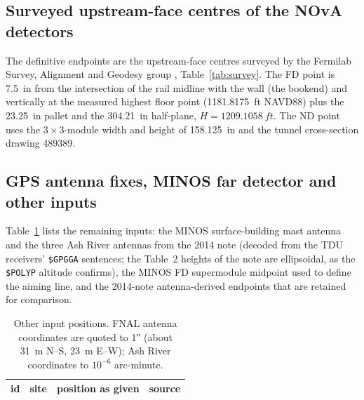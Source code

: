 \documentclass[11pt,letterpaper]{article}
\newcommand{\ND}{ND}
\newcommand{\FD}{FD}
\newcommand{\code}[1]{\texttt{#1}}
\begin{document}
\subsection{Surveyed upstream-face centres of the NOvA detectors}
The definitive endpoints are the upstream-face centres surveyed by the Fermilab Survey, Alignment and Geodesy group \cite{bocean2026nd,bocean2026fd}, Table~\ref{tab:survey}.  The \FD{} point is \SI{7.5}{in} from the intersection of the rail midline with the wall (the bookend) and vertically at the measured highest floor point (\SI{1181.8175}{ft} NAVD88) plus the \SI{23.25}{in} pallet and the \SI{304.21}{in} half-plane, $H=\SI{1209.1058}{ft}$.  The \ND{} point uses the $3\times3$-module width and height of \SI{158.125}{in} and the tunnel cross-section drawing 489389.

\begin{table}[htbp]\centering\small
\caption{Surveyed upstream-face centres in the NuMI beamline system (origin MCZERO; $X$ right, $Y$ stationing, $Z$ up) \cite{bocean2026nd,bocean2026fd}.  Frame as realised in this note.}
\label{tab:survey}
\end{table}

\subsection{GPS antenna fixes, MINOS far detector and other inputs}
Table~\ref{tab:inputs} lists the remaining inputs: the MINOS surface-building mast antenna and the three Ash River antennas from the 2014 note \cite{norman2014} (decoded from the TDU receivers' \code{\$GPGGA} sentences; the Table~2 heights of the note are ellipsoidal, as the \code{\$POLYP} altitude confirms), the MINOS \FD{} supermodule midpoint \cite{minos2008} used to define the aiming line, and the 2014-note antenna-derived endpoints that are retained for comparison.

\begin{table}[htbp]\centering\scriptsize
\caption{Other input positions.  FNAL antenna coordinates are quoted to \ang{;;1} (about \SI{31}{m} N--S, \SI{23}{m} E--W); Ash River coordinates to $10^{-6}$ arc-minute.}
\label{tab:inputs}
\begin{tabular}{p{1.5cm}p{3.4cm}p{5.4cm}p{4.3cm}}
\toprule
id & site & position as given & source \\
\midrule

\end{tabular}
\end{table}
\end{document}
